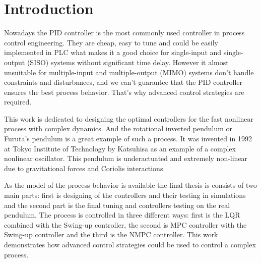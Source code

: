 \chapter{Introduction}
\label{ch:intro}
Nowadays the PID controller is the most commonly used controller in process control engineering. They are cheap, easy to tune and could be easily implemented in PLC what makes it a good choice for single-input and single-output (SISO) systems without significant time delay. However it almost unsuitable for multiple-input and multiple-output (MIMO) systems don’t handle constraints and disturbances, and we can’t guarantee that the PID controller ensures the best process behavior. That’s why advanced control strategies are required.

This work is dedicated to designing the optimal controllers for the fast nonlinear process with complex dynamics. And the rotational inverted pendulum or Furuta’s pendulum is a great example of such a process. It was invented in 1992 at Tokyo Institute of Technology by Katsuhisa as an example of a complex nonlinear oscillator. This pendulum is underactuated and extremely non-linear due to gravitational forces and Coriolis interactions.

As the model of the process behavior is available the final thesis is consists of two main parts: first is designing of the controllers and their testing in simulations and the second part is the final tuning and controllers testing on the real pendulum. The process is controlled in three different ways: first is the LQR combined with the Swing-up controller, the second is MPC controller with the Swing-up controller and the third is the NMPC controller. This work demonstrates how advanced control strategies could be used to control a complex process.